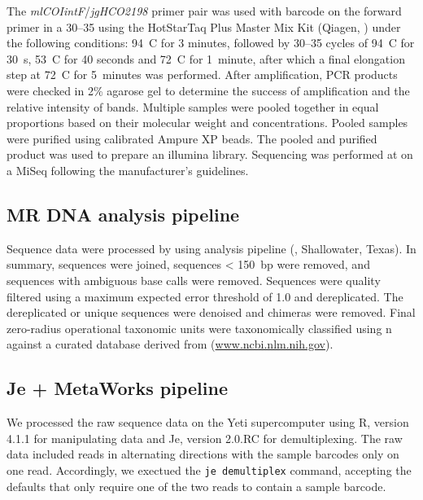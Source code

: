 \begin{multicols}{2}
The \textit{mlCOIintF}/\textit{jgHCO2198} primer pair was used with barcode on the forward primer in a 30--35  using the HotStarTaq Plus Master Mix Kit (Qiagen, ) under the following conditions: 94~\textdegree{}C for 3 minutes, followed by 30--35 cycles of 94~\textdegree{}C for 30~s, 53~\textdegree{}C for 40 seconds and 72~\textdegree{}C for 1~minute, after which a final elongation step at 72~\textdegree{}C for 5~minutes was performed.  After amplification, PCR products were checked in 2\% agarose gel to determine the success of amplification and the relative intensity of bands. Multiple samples were pooled together in equal proportions based on their molecular weight and  concentrations. Pooled samples were purified using calibrated Ampure XP beads. The pooled and purified  product was used to prepare an illumina  library. Sequencing was performed at  on a MiSeq following the manufacturer’s guidelines. 

\subsection{MR DNA analysis pipeline}

Sequence data were processed by using  analysis pipeline (, Shallowater, Texas).  In summary, sequences were joined, sequences < 150~bp were removed, and sequences with ambiguous base calls were removed. Sequences were quality filtered using a maximum expected error threshold of 1.0 and dereplicated. The dereplicated or unique sequences were denoised and chimeras were removed. Final zero-radius operational taxonomic units were taxonomically classified using n against a curated database derived from  (\url{www.ncbi.nlm.nih.gov}).   

\subsection{Je + MetaWorks pipeline}

We processed the raw sequence data on the  Yeti supercomputer \citep{USGSARC2021} using R, version 4.1.1 for manipulating data and Je, version 2.0.RC \citep{Girardotetal2016} for demultiplexing. The raw data included reads in alternating directions with the sample barcodes only on one read. Accordingly, we exectued the \verb|je demultiplex| command, accepting the defaults that only require one of the two reads to contain a sample barcode.


\end{multicols}
